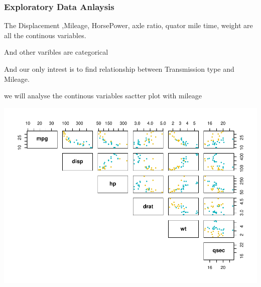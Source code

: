 \documentclass[
]{article}
\newenvironment{Shaded}{\begin{snugshade}}{\end{snugshade}}
\newcommand{\DataTypeTok}[1]{\textcolor[rgb]{0.13,0.29,0.53}{#1}}
\newcommand{\DecValTok}[1]{\textcolor[rgb]{0.00,0.00,0.81}{#1}}
\newcommand{\FloatTok}[1]{\textcolor[rgb]{0.00,0.00,0.81}{#1}}
\newcommand{\KeywordTok}[1]{\textcolor[rgb]{0.13,0.29,0.53}{\textbf{#1}}}
\newcommand{\NormalTok}[1]{#1}
\newcommand{\OperatorTok}[1]{\textcolor[rgb]{0.81,0.36,0.00}{\textbf{#1}}}
\newcommand{\OtherTok}[1]{\textcolor[rgb]{0.56,0.35,0.01}{#1}}
\newcommand{\StringTok}[1]{\textcolor[rgb]{0.31,0.60,0.02}{#1}}
\begin{document}
\hypertarget{exploratory-data-anlaysis}{%
\subsubsection{Exploratory Data
Anlaysis}\label{exploratory-data-anlaysis}}

The Displacement ,Mileage, HorsePower, axle ratio, quator mile time,
weight are all the continous variables.

And other varibles are categorical

And our only intrest is to find relationship between Transmission type
and Mileage.

we will analyse the continous variables sactter plot with mileage

\begin{Shaded}
\end{Shaded}

\includegraphics{MotorTrendAnalysis_files/figure-latex/pairPlots-1.pdf}
\end{document}
